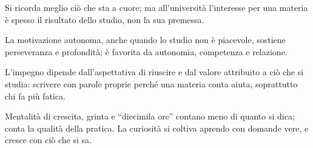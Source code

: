 \begin{sintesi}
  \item Si ricorda meglio ciò che sta a cuore; ma all'università
        l'interesse per una materia è spesso il risultato dello studio,
        non la sua premessa.
  \item La motivazione autonoma, anche quando lo studio non è piacevole,
        sostiene perseveranza e profondità; è favorita da autonomia,
        competenza e relazione.
  \item L'impegno dipende dall'aspettativa di riuscire e dal valore
        attribuito a ciò che si studia: scrivere con parole proprie
        perché una materia conta aiuta, soprattutto chi fa più fatica.
  \item Mentalità di crescita, grinta e \enquote{diecimila ore} contano
        meno di quanto si dica; conta la qualità della pratica. La
        curiosità si coltiva aprendo con domande vere, e cresce con ciò
        che si sa.
\end{sintesi}

\finecapitolo
